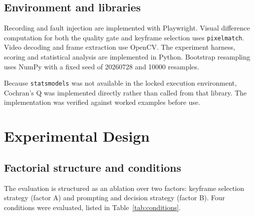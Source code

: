 \subsection{Environment and libraries}

Recording and fault injection are implemented with Playwright. Visual
difference computation for both the quality gate and keyframe selection
uses \texttt{pixelmatch}. Video decoding and frame extraction use OpenCV.
The experiment harness, scoring and statistical analysis are implemented
in Python. Bootstrap resampling uses NumPy with a fixed seed of
\num{20260728} and \num{10000} resamples.

Because \texttt{statsmodels} was not available in the locked execution
environment, Cochran's Q was implemented directly rather than called from
that library. The implementation was verified against worked examples
before use.


\section{Experimental Design}
\label{sec:expdesign}

\subsection{Factorial structure and conditions}

The evaluation is structured as an ablation over two factors: keyframe
selection strategy (factor A) and prompting and decision strategy
(factor B). Four conditions were evaluated, listed in
Table~\ref{tab:conditions}.

